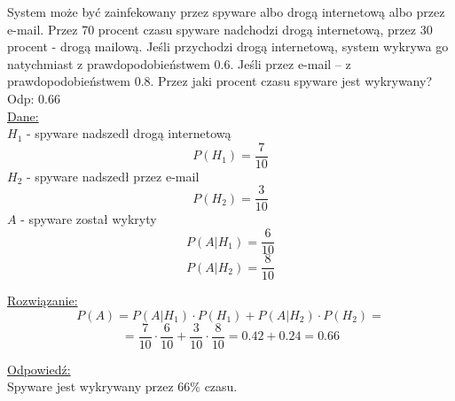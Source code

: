 \begin{zad}
System może być zainfekowany przez spyware albo drogą internetową albo przez e-mail. Przez 70 procent czasu spyware nadchodzi drogą internetową, przez 30 procent - drogą mailową. Jeśli przychodzi drogą internetową, system wykrywa go natychmiast z prawdopodobieństwem 0.6. Jeśli przez e-mail -- z prawdopodobieństwem 0.8. Przez jaki procent czasu spyware jest wykrywany? Odp: 0.66 \\

\underline{Dane:}
$$
$$
$H_{1}$ - spyware nadszedł drogą internetową
$$
P(H_{1}) = \frac{7}{10}
$$
$H_{2}$ - spyware  nadszedł przez e-mail
$$
P(H_{2}) = \frac{3}{10}
$$
$A$ -  spyware został wykryty
$$
P(A|H_{1}) = \frac{6}{10}
$$
$$
P(A|H_{2}) = \frac{8}{10}
$$

\underline{Rozwiązanie:}\\
$$
P(A) = P(A|H_{1}) \cdot P(H_{1}) + P(A|H_{2}) \cdot P(H_{2}) = 
$$
$$
= \frac{7}{10} \cdot  \frac{6}{10} + \frac{3}{10} \cdot \frac{8}{10} = 0.42 + 0.24 = 0.66
$$

\underline{Odpowiedź:} \\
Spyware jest wykrywany przez $66\%$ czasu.
\end{zad}
